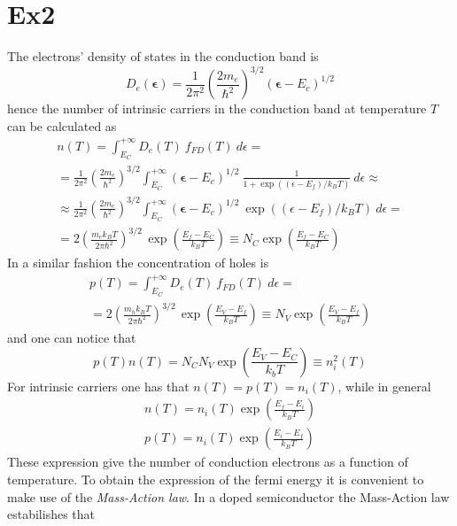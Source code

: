 \documentclass{article}
\begin{document}
\newpage

\section*{Ex2}
The electrons' density of states in the conduction band is 
\begin{equation*}
    D_{e}(\boldsymbol{\epsilon})=\frac{1}{2 \pi^{2}}\left(\frac{2 m_{e}}{\hbar^{2}}\right)^{3 / 2}\left(\boldsymbol{\epsilon}-E_{c}\right)^{1 / 2}
\end{equation*}
hence the number of intrinsic carriers in the conduction band at temperature $T$ can be calculated as 
\begin{gather*}
    n(T) = \int_{E_C}^{+\infty} D_e(T) \ f_{FD}(T) \ d\epsilon = \\
    = \frac{1}{2 \pi^{2}}\left(\frac{2 m_{e}}{\hbar^{2}}\right)^{3 / 2}\int_{E_C}^{+\infty} \left(\boldsymbol{\epsilon}-E_{c}\right)^{1 / 2} \ \frac{1}{1+\exp\left((\epsilon - E_f)/k_BT\right)} \ d\epsilon \approx \\ 
    \approx \frac{1}{2 \pi^{2}}\left(\frac{2 m_{e}}{\hbar^{2}}\right)^{3 / 2}\int_{E_C}^{+\infty} \left(\boldsymbol{\epsilon}-E_{c}\right)^{1 / 2} \ \exp\left((\epsilon-E_f)/k_BT\right) \ d\epsilon = \\
    = 2 \left(\frac{m_ek_BT}{2\pi\hbar^2}\right)^{3/2} \, \exp\left(\frac{E_f-E_C}{k_BT}\right) \equiv N_C \exp\left(\frac{E_f-E_C}{k_BT}\right)
\end{gather*} 
In a similar fashion the concentration of holes is 
\begin{gather*}
    p(T) = \int_{E_C}^{+\infty} D_e(T) \ f_{FD}(T) \ d\epsilon = \\
    = 2 \left(\frac{m_hk_BT}{2\pi\hbar^2}\right)^{3/2} \, \exp\left(\frac{E_V-E_f}{k_BT}\right) \equiv N_V \exp\left(\frac{E_V-E_f}{k_BT}\right)
\end{gather*}
and one can notice that  
\begin{equation*}
    p(T)n(T) = N_CN_V \exp\left(\frac{E_V-E_C}{k_bT}\right) \equiv n_i^2(T)
\end{equation*}
For intrinsic carriers one has that $n(T)=p(T)=n_i(T)$, while in general 
\begin{gather}
    n(T) = n_i(T)\exp\left(\frac{E_f-E_i}{k_BT}\right) 
    \label{eq:n(T)} \\
    p(T) = n_i(T)\exp\left(\frac{E_i-E_f}{k_BT}\right)
\end{gather}
These expression give the number of conduction electrons as a function of temperature. To obtain
the expression of the fermi energy it is convenient to make use of the \emph{Mass-Action law}. In a doped semiconductor the Mass-Action law estabilishes that
\end{document}
